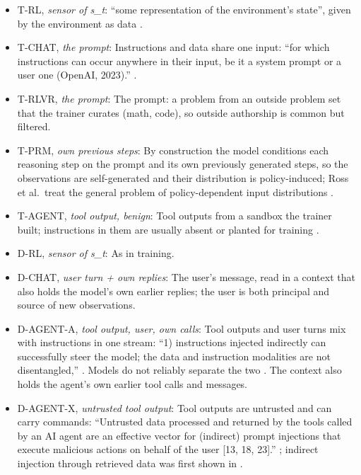 \documentclass{article}
\providecommand{\tightlist}{\setlength{\itemsep}{0pt}\setlength{\parskip}{0pt}}
\begin{document}
\begin{itemize}
\tightlist
\item
  T-RL, \emph{sensor of s\_t}: ``some representation of the environment's state'', given by the environment as data \citep{sutton2018}.
\item
  T-CHAT, \emph{the prompt}: Instructions and data share one input: ``for which instructions can occur anywhere in their input, be it a system prompt or a user one (OpenAI, 2023).'' \citep{zverev2025}.
\item
  T-RLVR, \emph{the prompt}: The prompt: a problem from an outside problem set that the trainer curates (math, code), so outside authorship is common but filtered.
\item
  T-PRM, \emph{own previous steps}: By construction the model conditions each reasoning step on the prompt and its own previously generated steps, so the observations are self-generated and their distribution is policy-induced; Ross et al.~treat the general problem of policy-dependent input distributions \citep{ross2011}.
\item
  T-AGENT, \emph{tool output, benign}: Tool outputs from a sandbox the trainer built; instructions in them are usually absent or planted for training \citep{wallace2024}.
\item
  D-RL, \emph{sensor of s\_t}: As in training.
\item
  D-CHAT, \emph{user turn + own replies}: The user's message, read in a context that also holds the model's own earlier replies; the user is both principal and source of new observations.
\item
  D-AGENT-A, \emph{tool output, user, own calls}: Tool outputs and user turns mix with instructions in one stream: ``1) instructions injected indirectly can successfully steer the model; the data and instruction modalities are not disentangled,'' \citep{greshake2023}. Models do not reliably separate the two \citep{zverev2025}. The context also holds the agent's own earlier tool calls and messages.
\item
  D-AGENT-X, \emph{untrusted tool output}: Tool outputs are untrusted and can carry commands: ``Untrusted data processed and returned by the tools called by an AI agent are an effective vector for (indirect) prompt injections that execute malicious actions on behalf of the user {[}13, 18, 23{]}.'' \citep{debenedetti2024}; indirect injection through retrieved data was first shown in \citep{greshake2023}.
\end{itemize}
\end{document}
